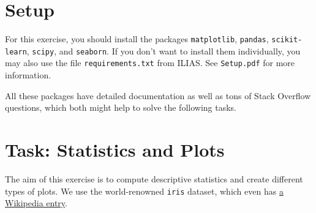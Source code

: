 \documentclass[12pt]{article}
\newcommand{\code}[1]{\textcolor{kitgreen}{\texttt{#1}}}
\begin{document}
\section*{Setup}

For this exercise, you should install the packages \code{matplotlib}, \code{pandas}, \code{scikit-learn}, \code{scipy}, and \code{seaborn}.
If you don't want to install them individually, you may also use the file \code{requirements.txt} from ILIAS.
See \code{Setup.pdf} for more information.

All these packages have detailed documentation as well as tons of Stack Overflow questions, which both might help to solve the following tasks.

\section*{Task: Statistics and Plots}

The aim of this exercise is to compute descriptive statistics and create different types of plots.
We use the world-renowned \code{iris} dataset, which even has \href{https://en.wikipedia.org/wiki/Iris_flower_data_set}{a Wikipedia entry}.
\end{document}
